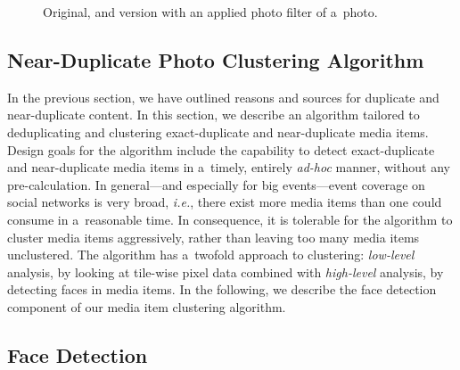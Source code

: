 \begin{figure}[!ht]
  \centering
  \caption{Original, and version with an applied photo filter of a~photo.}
  \label{fig:photo-filter}  
\end{figure}

\subsection{Near-Duplicate Photo Clustering Algorithm}
\label{sec:near-duplicate-clustering-algorithm}

In the previous section, we have outlined
reasons and sources for duplicate and near-duplicate content.
In this section, we describe an algorithm tailored to
deduplicating and clustering exact-duplicate and near-duplicate media items.
Design goals for the algorithm include
the capability to detect exact-duplicate and near-duplicate media items
in a~timely, entirely \emph{ad-hoc} manner, without any pre-calculation.
In general---and especially for big events---event coverage on social networks
is very broad, \emph{i.e.}, there exist more media items
than one could consume in a~reasonable time.
In consequence, it is tolerable for the algorithm to cluster media items aggressively,
rather than leaving too many media items unclustered.
The algorithm has a~twofold approach to clustering:
\emph{low-level} analysis, by looking at tile-wise pixel data
combined with \emph{high-level} analysis, by detecting faces in media items.
In the following, we describe the face detection component
of our media item clustering algorithm.

\subsection{Face Detection}
\label{sec:face-detection}

